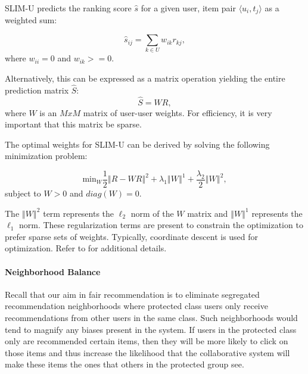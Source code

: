 SLIM-U predicts the ranking score $\hat{s}$ for a given user, item pair $\langle u_i, t_j \rangle$ as a weighted sum:

\begin{equation}
    \hat{s}_{ij} = \sum_{k \in U}{w_{ik}r_{kj}}, 
\end{equation}
where $w_{ii} = 0$ and $w_{ik} >= 0$.

Alternatively, this can be expressed as a matrix operation yielding the entire prediction matrix $\hat{S}$:    
\begin{equation}
\hat{S} = WR,
\end{equation}
where $W$ is an $M x M$ matrix of user-user weights. For efficiency, it is very important that this matrix be sparse.

The optimal weights for SLIM-U can be derived by solving the following minimization problem:

\begin{equation}
\mbox{min}_W \frac{1}{2}\left\Vert R - WR \right\Vert^2 + 
    \lambda_1 \left\Vert W \right\Vert^1 +
    \frac{\lambda_2}{2}\left\Vert W \right\Vert^2,   
\end{equation}
subject to $W > 0$  and $diag(W) = 0$.

The $\left\Vert W \right\Vert^2$ term represents the $\ell_2$ norm of the $W$ matrix and $\left\Vert W \right\Vert^1$ represents the $\ell_1$ norm. These regularization terms are present to constrain the optimization to prefer sparse sets of weights. Typically, coordinate descent is used for optimization. Refer to \cite{ning2011slim} for additional details. 

\paragraph{\textbf{Neighborhood Balance}}

Recall that our aim in fair recommendation is to eliminate segregated recommendation neighborhoods where protected class users only receive recommendations from other users in the same class. Such neighborhoods would tend to magnify any biases present in the system. If users in the protected class only are recommended certain items, then they will be more likely to click on those items and thus increase the likelihood that the collaborative system will make these items the ones that others in the protected group see.

